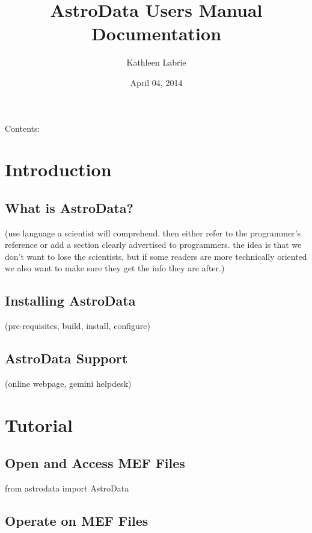 \documentclass[letterpaper,10pt,english]{sphinxmanual}
\title{AstroData Users Manual Documentation}
\date{April 04, 2014}
\author{Kathleen Labrie}
\begin{document}
\maketitle
\tableofcontents
{}\label{index::doc}


Contents:


\chapter{Introduction}
\label{intro:introduction}\label{intro::doc}\label{intro:astrodata-user-s-manual}

\section{What is AstroData?}
\label{intro:what-is-astrodata}
(use language a scientist will comprehend.  then either refer to the programmer's reference
or add a section clearly advertised to programmers.  the idea is that we don't want to lose
the scientists, but if some readers are more technically oriented we also want to make sure
they get the info they are after.)


\section{Installing AstroData}
\label{intro:installing-astrodata}
(pre-requisites, build, install, configure)


\section{AstroData Support}
\label{intro:astrodata-support}
(online webpage, gemini helpdesk)


\chapter{Tutorial}
\label{tutorial::doc}\label{tutorial:tutorial}

\section{Open and Access MEF Files}
\label{tutorial:open-and-access-mef-files}
from astrodata import AstroData


\section{Operate on MEF Files}
\label{tutorial:operate-on-mef-files}
\end{document}
